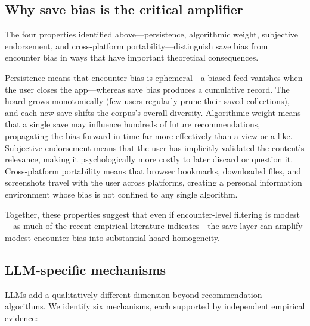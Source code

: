 \documentclass[12pt,a4paper]{article}
\begin{document}
\subsection{Why save bias is the critical amplifier}

The four properties identified above---persistence, algorithmic weight, subjective endorsement, and cross-platform portability---distinguish save bias from encounter bias in ways that have important theoretical consequences.

Persistence means that encounter bias is ephemeral---a biased feed vanishes when the user closes the app---whereas save bias produces a cumulative record.
The hoard grows monotonically (few users regularly prune their saved collections), and each new save shifts the corpus's overall diversity.
Algorithmic weight means that a single save may influence hundreds of future recommendations, propagating the bias forward in time far more effectively than a view or a like.
Subjective endorsement means that the user has implicitly validated the content's relevance, making it psychologically more costly to later discard or question it.
Cross-platform portability means that browser bookmarks, downloaded files, and screenshots travel with the user across platforms, creating a personal information environment whose bias is not confined to any single algorithm.

Together, these properties suggest that even if encounter-level filtering is modest---as much of the recent empirical literature indicates---the save layer can amplify modest encounter bias into substantial hoard homogeneity.


\subsection{LLM-specific mechanisms}

LLMs add a qualitatively different dimension beyond recommendation algorithms.
We identify six mechanisms, each supported by independent empirical evidence:
\end{document}
